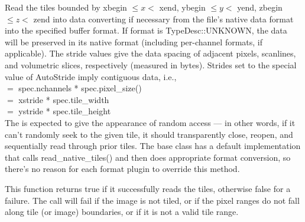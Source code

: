 Read the tiles bounded by {\kw xbegin} $\le x <$ {\kw xend},
{\kw ybegin} $\le y <$ {\kw yend}, {\kw zbegin} $\le z <$ {\kw zend}
into {\kw data}
converting if necessary from the file's native data format into
the specified buffer {\kw format}.
If {\cf format} is {\cf TypeDesc::UNKNOWN}, the data will be preserved 
in its native format (including per-channel formats, if applicable).
The stride values
give the data spacing of adjacent pixels, scanlines, and volumetric
slices, respectively (measured in bytes).  Strides set to the special
value of {\kw AutoStride} imply contiguous data, i.e., \\
 $=$ {\kw spec.nchannels * spec.pixel_size()} \\
 $=$ {\kw xstride * spec.tile_width} \\
 $=$ {\kw ystride * spec.tile_height} \\
The \ImageInput is expected to give the appearance of random access
--- in other words, if it can't randomly seek to the given tile, it
should transparently close, reopen, and sequentially read through prior
tiles.  The base \ImageInput class has a default implementation
that calls {\cf read_native_tiles()} and then does appropriate format conversion,
so there's no reason for each format plugin to override this method.

This function returns {\cf true} if it successfully reads the tiles,
otherwise {\cf false} for a failure.
The call will fail if the image is not tiled, or if the pixel ranges
do not fall along tile (or image) boundaries, or if it is not a valid
tile range.
\apiend



